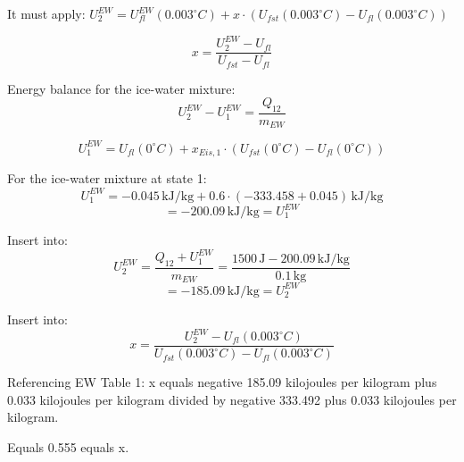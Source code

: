 It must apply:  
\( U_2^{EW} = U_{fl}^{EW}(0.003^\circ C) + x \cdot (U_{fst}(0.003^\circ C) - U_{fl}(0.003^\circ C)) \)  

\[ x = \frac{U_2^{EW} - U_{fl}}{U_{fst} - U_{fl}} \]  

Energy balance for the ice-water mixture:  
\[ U_2^{EW} - U_1^{EW} = \frac{Q_{12}}{m_{EW}} \]  

\[ U_1^{EW} = U_{fl}(0^\circ C) + x_{Eis,1} \cdot (U_{fst}(0^\circ C) - U_{fl}(0^\circ C)) \]  

For the ice-water mixture at state 1:  
\[ U_1^{EW} = -0.045 \, \text{kJ/kg} + 0.6 \cdot (-333.458 + 0.045) \, \text{kJ/kg} \]  
\[ = -200.09 \, \text{kJ/kg} = U_1^{EW} \]  

Insert into:  
\[ U_2^{EW} = \frac{Q_{12} + U_1^{EW}}{m_{EW}} = \frac{1500 \, \text{J} - 200.09 \, \text{kJ/kg}}{0.1 \, \text{kg}} \]  
\[ = -185.09 \, \text{kJ/kg} = U_2^{EW} \]  

Insert into:  
\[ x = \frac{U_2^{EW} - U_{fl}(0.003^\circ C)}{U_{fst}(0.003^\circ C) - U_{fl}(0.003^\circ C)} \]

Referencing EW Table 1:  
x equals negative 185.09 kilojoules per kilogram plus 0.033 kilojoules per kilogram divided by negative 333.492 plus 0.033 kilojoules per kilogram.  

Equals 0.555 equals x.